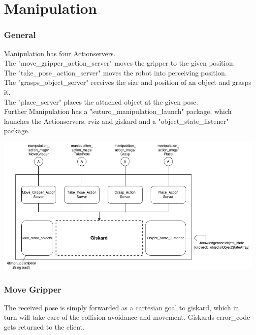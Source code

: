 \documentclass[main.tex]{subfiles}
\begin{document}
	
	\chapter{Manipulation}
	
	\subsection{General}
	Manipulation has four Actionservers.\\
	The "move\_gripper\_action\_server" moves the gripper to the given position.\\
	The "take\_pose\_action\_server" moves the robot into perceiving position.\\
	The "grasps\_object\_server" receives the size and position of an object and grasps it.\\
	The "place\_server" places the attached object at the given pose.\\
	Further Manipulation has a "suturo\_manipulation\_launch" package, which launches the Actionservers, rviz and giskard and a "object\_state\_listener" package.
	
\begin{flushleft}
	
\end{flushleft}	\includegraphics[scale=0.5]{pictures/Manipulation.png}
	
	\subsection{Move Gripper}
	The received pose is simply forwarded as a cartesian goal to giskard, which in turn will take care of the collision avoidance and movement. Giskards error\_code gets returned to the client.
	\vspace{1cm}
	
\end{document}
